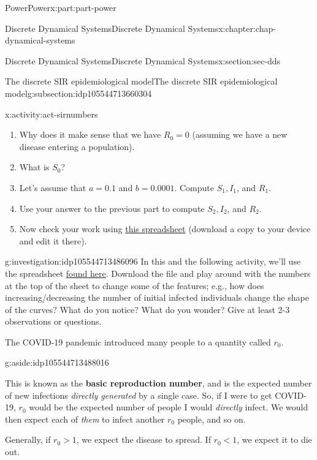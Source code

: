 \documentclass[oneside,10pt,]{book}
\newcommand{\terminology}[1]{\textbf{#1}}
\numberwithin{equation}{section}
\newcommand{\lt}{<}
\newcommand{\gt}{>}
\begin{document}
\begin{partptx}{Power}{}{Power}{}{}{x:part:part-power}
\begin{chapterptx}{Discrete Dynamical Systems}{}{Discrete Dynamical Systems}{}{}{x:chapter:chap-dynamical-systems}
\begin{sectionptx}{Discrete Dynamical Systems}{}{Discrete Dynamical Systems}{}{}{x:section:sec-dds}
\begin{subsectionptx}{The discrete SIR epidemiological model}{}{The discrete SIR epidemiological model}{}{}{g:subsection:idp105544713660304}
\begin{activity}{}{x:activity:act-sirnumbers}
%
\begin{enumerate}
\item{}Why does it make sense that we have \(R_0 = 0\) (assuming we have a new disease entering a population).%
\item{}What is \(S_0\)?%
\item{}Let's assume that \(a = 0.1\) and \(b = 0.0001\). Compute \(S_1, I_1\), and \(R_1\).%
\item{}Use your answer to the previous part to compute \(S_2, I_2\), and \(R_2\).%
\item{}Now check your work using \href{https://docs.google.com/spreadsheets/d/153LO2O21_TwEYyODq2Km90oRrilLEpfYmgb8w3AJSQo/edit?usp=sharing}{this spreadsheet}\footnotemark{} (download a copy to your device and edit it there).%
\end{enumerate}
\end{activity}%
%
\begin{investigation}{}{g:investigation:idp105544713486096}%
In this and the following activity, we'll use the spreadsheet \href{https://docs.google.com/spreadsheets/d/153LO2O21_TwEYyODq2Km90oRrilLEpfYmgb8w3AJSQo/edit?usp=sharing}{found here}\footnotemark{}. Download the file and play around with the numbers at the top of the sheet to change some of the features; e.g., how does increasing\slash{}decreasing the number of initial infected individuals change the shape of the curves? What do you notice? What do you wonder? Give at least 2-3 observations or questions.%
\end{investigation}%
%
The COVID-19 pandemic introduced many people to a quantity called \(r_0\). \begin{aside}{}{g:aside:idp105544713488016}%
\end{aside}
 This is known as the \terminology{basic reproduction number}, and is the expected number of new infections \emph{directly generated} by a single case. So, if I were to get COVID-19, \(r_0\) would be the expected number of people I would \emph{directly} infect. We would then expect each of \emph{them} to infect another \(r_0\) people, and so on.%
\par
Generally, if \(r_0 \gt 1\), we expect the disease to spread. If \(r_0 \lt 1\), we expect it to die out.%

\end{subsectionptx}
\end{sectionptx}
\end{chapterptx}
\end{partptx}
\end{document}
